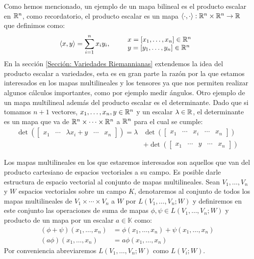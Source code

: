 Como hemos mencionado, un ejemplo de un mapa bilineal es el producto escalar en $\mathbb{R}^n$, como recordatorio, el producto escalar es un mapa $\langle \cdot , \cdot \rangle: \mathbb{R}^n \times \mathbb{R}^n \to \mathbb{R}$ que definimos como:
\[
	\langle x,y \rangle = \sum_{i=1}^{n} x_i y_i, \quad\quad
	\begin{array}{l}
		x=[x_1,\dots,x_n] \in \mathbb{R}^n \\
		y=[y_1,\dots,y_n] \in \mathbb{R}^n
	\end{array}
\]
En la sección \ref{Sección: Variedades Riemannianas} extendemos la idea del producto escalar a variedades, esta es en gran parte la razón por la que estamos interesados en los mapas multilineales y los tensores ya que nos permiten realizar algunos cálculos importantes, como por ejemplo medir ángulos.
Otro ejemplo de un mapa multilineal además del producto escalar es el determinante. Dado que si tomamos $n+1$ vectores, $x_1, \ldots, x_n, y \in \mathbb{R}^n$ y un escalar $\lambda \in \mathbb{R}$, el determinante es un mapa que va de $\mathbb{R}^n \times \cdots \times \mathbb{R}^n$ a $\mathbb{R}^n$ para el cual se cumple:
\begin{align*}
	\det(\begin{bmatrix}x_1 & \cdots & \lambda x_i + y & \cdots & x_n \end{bmatrix}) = \lambda &
	\det(\begin{bmatrix}x_1 & \cdots &x_i&\cdots& x_n \end{bmatrix})                                                                                                  \\
	                                                                                           & + \det(\begin{bmatrix}x_1 & \cdots & y & \cdots & x_n \end{bmatrix})
\end{align*}

Los mapas multilineales en los que estaremos interesados son aquellos que van del producto cartesiano de espacios vectoriales a su campo. Es posible darle estructura de espacio vectorial al conjunto de mapas multilineales. Sean $V_1, \ldots, V_n$ y $W$ espacios vectoriales sobre un campo $K$, denotaremos al conjunto de todos los mapas multilineales de $V_1 \times \cdots \times V_n$ a $W$ por $L(V_1,\ldots,V_n;W)$ y definiremos en este conjunto las operaciones de suma de mapas $\phi, \psi \in L(V_1,\ldots,V_n;W)$ y producto de un mapa por un escalar $a \in \mathbb{K}$ como:
\begin{align*}
	(\phi + \psi)(x_1, \ldots, x_n) & = \phi(x_1,\ldots,x_n) + \psi(x_1,\ldots,x_n) \\
	(a \phi)(x_1, \ldots, x_n)      & = a \phi(x_1, \ldots, x_n)
\end{align*}
Por conveniencia abreviaremos $L(V_1, \ldots, V_n; W)$ como $L(V_i;W)$.
